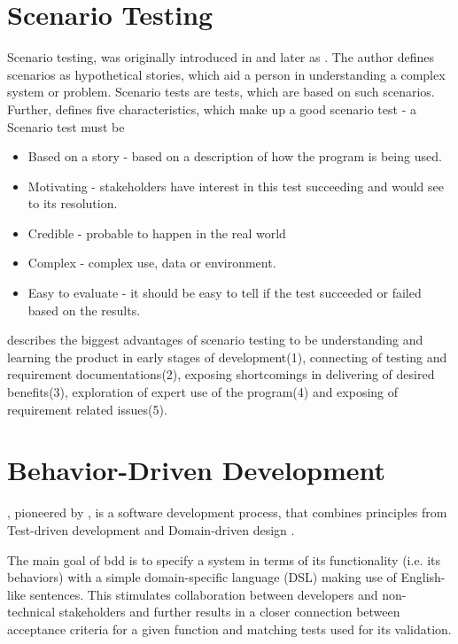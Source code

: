 \section{Scenario Testing}
Scenario testing, was originally introduced in \textcite{kaner2003power} and later as \textcite{kaner2013introduction}. The author defines scenarios as hypothetical stories, which aid a person in understanding a complex system or problem. Scenario tests are tests, which are based on such scenarios.  \parencite[1]{kaner2013introduction}
Further, \parencite[2-5]{kaner2003power} defines five characteristics, which make up a good scenario test -
a Scenario test must be
\begin{itemize}
     \item Based on a story - based on a description of how the program is being used.
    \item Motivating - stakeholders have interest in this test succeeding and would see to its resolution.
    \item Credible - probable to happen in the real world
    \item Complex - complex use, data or environment.
    \item Easy to evaluate - it should be easy to tell if the test succeeded or failed based on the results.
\end{itemize}

\textcite{kaner2013introduction} describes the biggest advantages of scenario testing to be  understanding and learning the product in early stages of development(1), connecting of testing and requirement documentations(2), exposing shortcomings in delivering of desired benefits(3), exploration of expert use of the program(4) and exposing of requirement related issues(5).

\section{Behavior-Driven Development}
\label{fundamentals:bdd}
, pioneered by \textcite{north2006behavior}, is a software development
process, that combines principles from Test-driven development and Domain-driven design \parencite{evans2004domain}.

The main goal of \gls{bdd} is to specify a system in terms of its functionality (i.e. its behaviors) with a simple domain-specific language (DSL) making use of English-like sentences. This stimulates collaboration between developers and non-technical stakeholders and further results in a closer connection between acceptance criteria for a given function and matching tests used for its validation.

